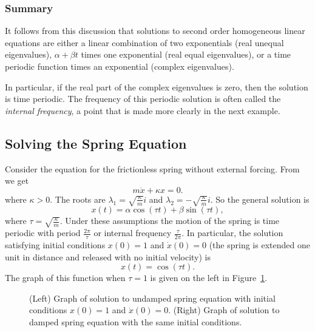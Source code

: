 \documentclass{ximera}
\begin{document}
\subsubsection*{Summary}

It follows from this discussion that solutions to second order
homogeneous linear equations are either a linear combination of two
exponentials (real unequal eigenvalues), $\alpha+\beta t$ times one
exponential (real equal eigenvalues), or a time periodic function times
an exponential (complex eigenvalues).

In particular, if the real part
of the complex eigenvalues is zero, then the solution is time periodic.
The frequency of this periodic solution is often called the {\em internal
frequency}, a point
that is made more clearly in the next example.


\subsection*{Solving the Spring Equation}

Consider the equation for the frictionless spring without
external forcing.  From  we get  
\begin{equation} \label{ex:uspring}
m\ddot{x} + \kappa x = 0.
\end{equation}
where $\kappa>0$.  The roots are $\lambda_1=\sqrt{\frac{\kappa}{m}}i$
and $\lambda_2=-\sqrt{\frac{\kappa}{m}}i$.  So the general solution is
\[
x(t) = \alpha\cos(\tau t) + \beta\sin(\tau t),
\]
where $\tau=\sqrt{\frac{\kappa}{m}}$.  Under these assumptions the
motion of the spring is time periodic with period $\frac{2\pi}{\tau}$
or internal frequency $\frac{\tau}{2\pi}$.  In particular, the solution
satisfying initial conditions $x(0)=1$ and $\dot{x}(0)=0$ (the spring is
extended one unit in distance and released with no initial velocity) is
\[
x(t) = \cos(\tau t).
\]
The graph of this function when $\tau=1$ is given on the
left in Figure~\ref{F:springp}.
\begin{figure}[htb]
           \centerline{%
           }
           \caption{(Left) Graph of solution to undamped spring
	equation with initial conditions $x(0)=1$ and $\dot{x}(0)=0$.
	(Right) Graph of solution to damped spring equation with the
	same initial conditions.}
           \label{F:springp}
\end{figure}
\end{document}
